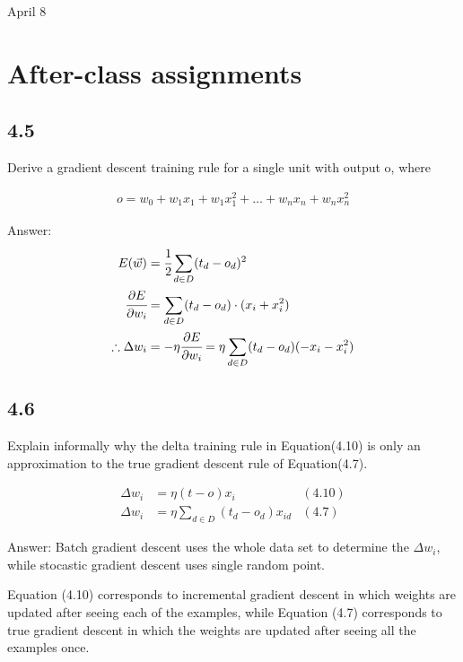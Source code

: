 \univlogo

{\Huge April 8}\vspace{5mm}

\section*{After-class assignments}

\subsection*{4.5}

Derive a gradient descent training rule for a single unit with output o, where

\begin{equation}
\begin{aligned}
    o=w_0+w_1x_1+w_1x_1^2+\dots+w_nx_n+w_nx_n^2
\end{aligned}
\end{equation}

Answer:
\begin{equation}
\begin{aligned}
    E(\vec{w})&=\cfrac{1}{2}\sum_{d\in D}(t_d-o_d)^2\\
    \cfrac{\partial E}{\partial w_i}&=\sum_{d\in D}(t_d-o_d)\cdot(x_i+x_i^2)\\
    \therefore \Delta w_i&=-\eta\cfrac{\partial E}{\partial w_i}=\eta\sum_{d\in D}(t_d-o_d)(-x_i-x_i^2)
\end{aligned}
\end{equation}

\subsection*{4.6}

Explain informally why the delta training rule in Equation(4.10) is only an approximation to the true gradient descent rule of Equation(4.7).

\begin{equation}
\begin{aligned}
    \Delta w_i&=\eta(t-o)x_i &(4.10)\\
    \Delta w_i&=\eta\sum_{d\in D}(t_d-o_d)x_{id} &(4.7)    \nonumber
\end{aligned}
\end{equation}

Answer:
Batch gradient descent uses the whole data set to determine the $\Delta w_i$, while stocastic gradient descent uses single random point.

Equation (4.10) corresponds to incremental gradient descent in which weights 
are updated after seeing each of the examples, while Equation (4.7) corresponds 
to true gradient descent in which the weights are updated after seeing all the 
examples once.